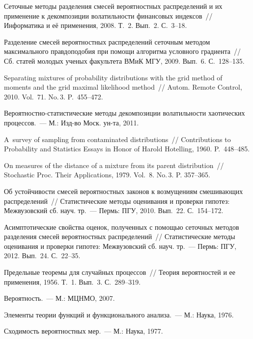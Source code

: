 \begin{multicols}{2}
{\small\frenchspacing
{%
\begin{thebibliography}{99}

Сеточные методы разделения смесей вероятностных распределений
и их применение к декомпозиции волатильности финансовых индексов~//
Информатика и её применения, 2008. Т.~2. Вып.~2. С.~3--18.

 Разделение смесей вероятностных распределений
сеточным методом максимального правдоподобия при помощи алгоритма
условного градиента~// Сб. статей молодых ученых факультета ВМиК
МГУ, 2009. Вып.~6. С.~128--135.

 Separating mixtures of probability
  distributions with the grid method of moments and the grid maximal likelihood
  method~// Autom. Remote Control, 2010. Vol.~71. No.\,3. P.~455--472.
  
 Ве\-ро\-ят\-но\-ст\-но-ста\-ти\-сти\-че\-ские методы декомпозиции
волатильности хаотических процессов.~--- М.: Изд-во Моск.
ун-та, 2011.

\pagebreak


 A~survey of sampling from contaminated
distributions~// Contributions to Probability and Statistics Essays
in Honor of Harold Hotelling, 1960. P.~448--485.

 On measures of the distance of a mixture from its
parent distribution~// Stochastic Proc. Their Applications,
1979. Vol.~8. No.\,3. P. 357--365.

 Об устойчивости смесей вероятностных законов к
возмущениям смешивающих распределений~// Статистические методы
оценивания и проверки гипотез: Межвузовский сб. науч. тр.~--- Пермь: ПГУ, 2010. 
Вып.~22. С.~154--172.

 Асимптотические свойства оценок, полученных с
помощью сеточных методов разделения смесей вероятностных
распределений~// Статистические методы оценивания и проверки
гипотез: Межвузовский сб. науч. тр.~--- Пермь: ПГУ, 2012.
Вып.~24. С.~22--35.

 Предельные теоремы для случайных процессов~//
Теория вероятностей и ее применения, 1956. Т.~1. Вып.~3.
С.~289--319.

 Вероятность.~--- М.: МЦНМО, 2007.

 Элементы теории функций и
функционального анализа.~--- М.: Наука, 1976.

\label{end\stat}

 Сходимость вероятностных мер.~--- М.: Наука, 1977.
\end{thebibliography}
}
}

\end{multicols}